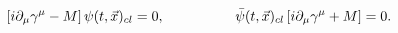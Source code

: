 \begin{equation}
\label{operator equationclassical}
\left[i \partial_{\mu}\gamma^{\mu} - M\right]\psi(t,{\vec x})_{cl} = 0,
\hspace{0.7in}
\bar{\psi}(t,{\vec x})_{cl}\left[i \partial_{\mu}\gamma^{\mu} + M\right] 
= 0.
\end{equation}

